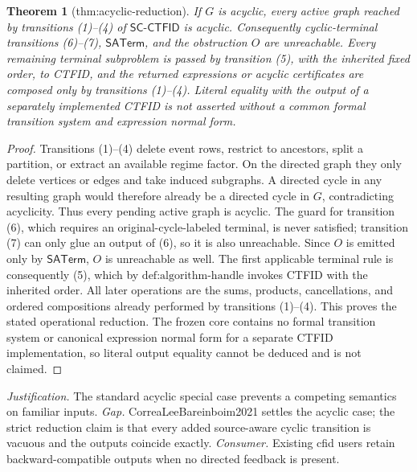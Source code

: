 \documentclass{article}
\newtheorem{theorem}{Theorem}
\begin{document}
\begin{theorem}[thm:acyclic-reduction]\label{thm:acyclic-reduction}
If \(G\) is acyclic, every active graph reached by transitions (1)--(4) of \(\mathsf{SC\mbox{-}CTFID}\) is acyclic.  Consequently cyclic-terminal transitions (6)--(7), \(\mathsf{SATerm}\), and the obstruction \(O\) are unreachable.  Every remaining terminal subproblem is passed by transition (5), with the inherited fixed order, to CTFID, and the returned expressions or acyclic certificates are composed only by transitions (1)--(4).  Literal equality with the output of a separately implemented CTFID is not asserted without a common formal transition system and expression normal form.
\end{theorem}
\begin{proof}
Transitions (1)--(4) delete event rows, restrict to ancestors, split a partition, or extract an available regime factor.  On the directed graph they only delete vertices or edges and take induced subgraphs.  A directed cycle in any resulting graph would therefore already be a directed cycle in \(G\), contradicting acyclicity.  Thus every pending active graph is acyclic.  The guard for transition (6), which requires an original-cycle-labeled terminal, is never satisfied; transition (7) can only glue an output of (6), so it is also unreachable.  Since \(O\) is emitted only by \(\mathsf{SATerm}\), \(O\) is unreachable as well.  The first applicable terminal rule is consequently (5), which by \(\text{def:algorithm-handle}\) invokes CTFID with the inherited order.  All later operations are the sums, products, cancellations, and ordered compositions already performed by transitions (1)--(4).  This proves the stated operational reduction.  The frozen core contains no formal transition system or canonical expression normal form for a separate CTFID implementation, so literal output equality cannot be deduced and is not claimed.
\end{proof}
\par\smallskip\noindent \textit{Justification.} The standard acyclic special case prevents a competing semantics on familiar inputs. \textit{Gap.} CorreaLeeBareinboim2021 settles the acyclic case; the strict reduction claim is that every added source-aware cyclic transition is vacuous and the outputs coincide exactly. \textit{Consumer.} Existing cfid users retain backward-compatible outputs when no directed feedback is present.
\end{document}

